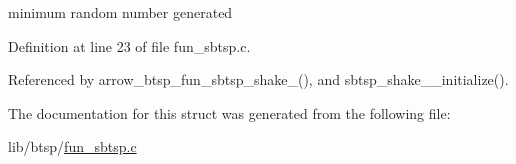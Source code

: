 minimum random number generated 

Definition at line 23 of file fun\_\-sbtsp.c.

Referenced by arrow\_\-btsp\_\-fun\_\-sbtsp\_\-shake\_(), and sbtsp\_\-shake\_\_\-initialize().

The documentation for this struct was generated from the following file:\begin{CompactItemize}
\item 
lib/btsp/\hyperlink{fun__sbtsp_8c}{fun\_\-sbtsp.c}\end{CompactItemize}

